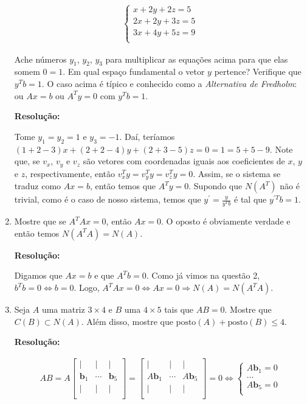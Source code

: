 \documentclass[leqno]{article}
\newcommand{\pst}[1]{\text{posto}(#1)}
\begin{document}
\begin{enumerate}
    \begin{align*}
        \begin{cases}
            x+2y+2z=5\\
            2x+2y+3z=5\\
            3x+4y+5z=9\\
        \end{cases}
    \end{align*}
    
    Ache números $y_1$, $y_2$, $y_3$ para multiplicar as equações acima para que elas somem $0=1$. Em qual espaço fundamental o vetor $y$ pertence? Verifique que $y^Tb=1$. O caso acima é típico e conhecido como a \textit{Alternativa de Fredholm}: ou $Ax=b$ ou $A^Ty=0$ com $y^Tb=1$.
    
    \textbf{Resolução:}
    
    Tome $y_1=y_2=1$ e $y_3=-1$. Daí, teríamos $(1+2-3)x+(2+2-4)y+(2+3-5)z=0=1=5+5-9$. Note que, se $v_x$, $v_y$ e $v_z$ são vetores com coordenadas iguais aos coeficientes de $x$, $y$ e $z$, respectivamente, então $v_x^Ty=v_y^Ty=v_z^Ty=0$. Assim, se o sistema se traduz como $Ax=b$, então temos que $A^Ty=0$. Supondo que $N(A^T)$ não é trivial, como é o caso de nosso sistema, temos que $y^\prime=\frac{y}{y^Tb}$ é tal que $y^{\prime T}b=1$.
    
    \item Mostre que se $A^TAx=0$, então $Ax=0$. O oposto é obviamente verdade e então temos $N(A^TA)=N(A)$.
    
    \textbf{Resolução:}
    
    Digamos que $Ax=b$ e que $A^Tb=0$. Como já vimos na questão 2, $b^Tb=0\iff b=0$. Logo, $A^TAx=0\iff Ax=0\Rightarrow N(A)=N(A^TA)$.
    
    \item Seja $A$ uma matriz $3\times4$ e $B$ uma $4\times5$ tais que $AB=0$. Mostre que $C(B)\subset N(A)$. Além disso, mostre que $\pst{A}+\pst{B}\leq4$.
    
    \textbf{Resolução:}
    
    \begin{align*}
        AB=A\begin{bmatrix}
            \vert & \vert & \vert\\
            \textbf{b}_1 & \cdots & \textbf{b}_5\\
            \vert & \vert & \vert\\
        \end{bmatrix}=\begin{bmatrix}
            \vert & \vert & \vert\\
            A\textbf{b}_1 & \cdots & A\textbf{b}_5\\
            \vert & \vert & \vert\\
        \end{bmatrix}=0\iff\begin{cases}
            A\textbf{b}_1=0\\
            \dots\\
            A\textbf{b}_5=0\\
        \end{cases}
    \end{align*}
    

\end{enumerate}
\end{document}
